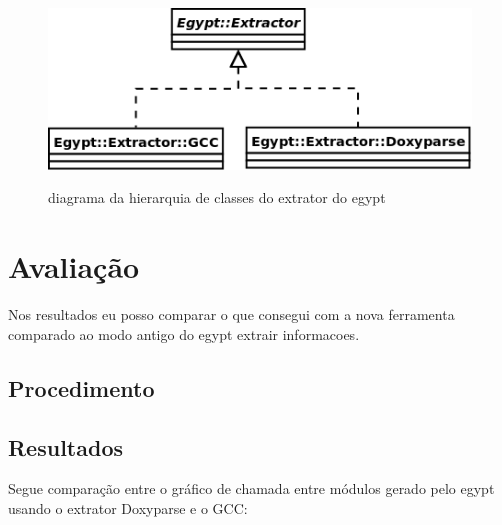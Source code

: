 \begin{figure}[h]
\center
\includegraphics[scale=0.5]{imagens/egypt-diagram-extractor}
\label{egypt-diagram-extractor}
\caption{diagrama da hierarquia de classes do extrator do egypt}
\end{figure}

\chapter{Avaliação}

Nos resultados eu posso comparar o que consegui com a nova ferramenta comparado ao modo antigo do egypt extrair informacoes.

\section{Procedimento}
\section{Resultados}

Segue comparação entre o gráfico de chamada entre módulos gerado pelo egypt usando o extrator Doxyparse e o GCC:

